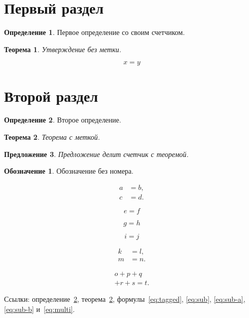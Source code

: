 \documentclass[12pt]{article}
\theoremstyle{plain}
\newtheorem{theorem}{Теорема}[section]
\newtheorem{proposition}[theorem]{Предложение}
\theoremstyle{definition}
\newtheorem{definition}{Определение}
\newtheorem*{notation}{Обозначение}
\numberwithin{equation}{section}
\begin{document}
\section{Первый раздел}

\begin{definition}
Первое определение со своим счетчиком.
\end{definition}

\begin{theorem}
Утверждение без метки.
\end{theorem}

\begin{equation}
  x = y
\end{equation}

\section{Второй раздел}

\begin{definition}\label{def:two}
Второе определение.
\end{definition}

\begin{theorem}\label{thm:two}
Теорема с меткой.
\end{theorem}

\begin{proposition}
Предложение делит счетчик с теоремой.
\end{proposition}

\begin{notation}
Обозначение без номера.
\end{notation}

\begin{align}
  a &= b, \\
  c &= d.
\end{align}

\begin{equation}\label{eq:tagged}
  e = f \tag{A}
\end{equation}

\begin{equation}
  g = h \tag*{B}
\end{equation}

\begin{equation*}
  i = j
\end{equation*}

\begin{subequations}\label{eq:sub}
\begin{align}
  k &= l, \label{eq:sub-a}\\
  m &= n. \label{eq:sub-b}
\end{align}
\end{subequations}

\begin{multline}\label{eq:multi}
  o + p + q \\
  + r + s = t.
\end{multline}

Ссылки: определение~\ref{def:two}, теорема~\ref{thm:two}, формулы~\eqref{eq:tagged},
\eqref{eq:sub}, \eqref{eq:sub-a}, \eqref{eq:sub-b} и~\eqref{eq:multi}.
\end{document}

